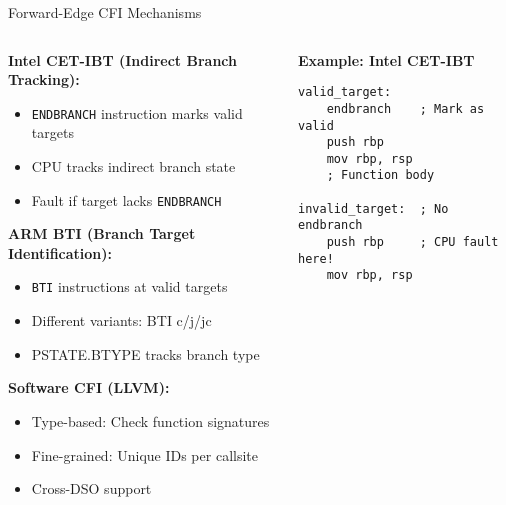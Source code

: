 \documentclass[aspectratio=169,12pt]{beamer}
\begin{document}
\begin{frame}[fragile]{Forward-Edge CFI Mechanisms}
    \begin{columns}
        \begin{column}{0.5\textwidth}
            \textbf{Intel CET-IBT (Indirect Branch Tracking):}
            \begin{itemize}
                \item \texttt{ENDBRANCH} instruction marks valid targets
                \item CPU tracks indirect branch state
                \item Fault if target lacks \texttt{ENDBRANCH}
            \end{itemize}
            
            \vspace{0.3cm}
            \textbf{ARM BTI (Branch Target Identification):}
            \begin{itemize}
                \item \texttt{BTI} instructions at valid targets
                \item Different variants: BTI c/j/jc
                \item PSTATE.BTYPE tracks branch type
            \end{itemize}
            
            \vspace{0.3cm}
            \textbf{Software CFI (LLVM):}
            \begin{itemize}
                \item Type-based: Check function signatures
                \item Fine-grained: Unique IDs per callsite
                \item Cross-DSO support
            \end{itemize}
        \end{column}
        \begin{column}{0.5\textwidth}
            \begin{tcolorbox}[colback=gray!10]
                \small
                \textbf{Example: Intel CET-IBT}
                \begin{verbatim}
valid_target:
    endbranch    ; Mark as valid
    push rbp
    mov rbp, rsp
    ; Function body
    
invalid_target:  ; No endbranch
    push rbp     ; CPU fault here!
    mov rbp, rsp
                \end{verbatim}
            \end{tcolorbox}
            

\end{column}
\end{columns}
\end{frame}
\end{document}
